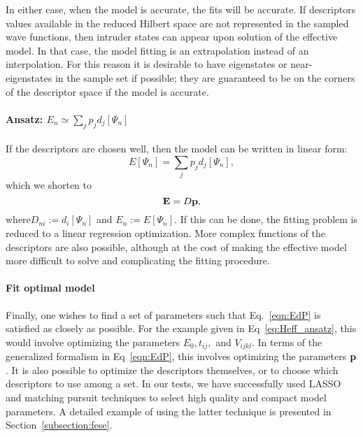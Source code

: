 In either case, when the model is accurate, the fits will be accurate.
If descriptors values available in the reduced Hilbert space are not represented in the sampled wave functions, then intruder states can appear upon solution of the effective model. 
In that case, the model fitting is an extrapolation instead of an interpolation.
For this reason it is desirable to have eigenstates or near-eigenstates in the sample set if possible; they are guaranteed to be on the corners of the descriptor space if the model is accurate.


\paragraph{Ansatz: $E_n \simeq \sum_j p_j d_{j} [\Psi_n] $} 
If the descriptors are chosen well, then the model can be written in linear form:
\begin{equation}\label{eq:linearfit_descriptor}
E[\Psi_n] = \sum_j p_j d_j[\Psi_n],	
\end{equation}
which we shorten to 
\begin{equation}
{\bf E} = D{\bf p} ,
\label{eqn:EdP}
\end{equation}
where$ D_{n i} := d_i[\Psi_n]$ and $E_n := E[\Psi_n]$. If this can be done, the fitting problem is reduced to a linear regression optimization.
More complex functions of the descriptors are also possible, although at the cost of making the effective model more difficult to solve and complicating the fitting procedure.


\paragraph{Fit optimal model}
Finally, one wishes to find a set of parameters such that Eq.~\eqref{eqn:EdP} is satisfied as closely as possible. 
For the example given in Eq~\eqref{eq:Heff_ansatz}, this would involve optimizing the parameters $E_0,t_{ij}, $ and $V_{ijkl}$. 
In terms of the generalized formalism in Eq~\eqref{eqn:EdP}, this involves optimizing the parameters ${\bf p}$. 
It is also possible to optimize the descriptors themselves, or to choose which descriptors to use among a set. 
In our tests, we have successfully used LASSO \cite{Lasso} and matching pursuit techniques \cite{MP_Zhang1993} to select high quality and compact model parameters. 
A detailed example of using the latter technique is presented in Section~\ref{subsection:fese}.


